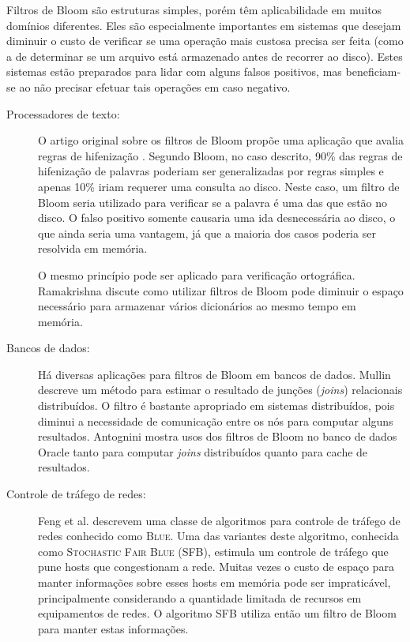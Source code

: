Filtros de Bloom são estruturas simples, porém têm aplicabilidade em muitos domínios diferentes. Eles são especialmente importantes em sistemas que desejam diminuir o custo de verificar se uma operação mais custosa precisa ser feita (como a de determinar se um arquivo está armazenado antes de recorrer ao disco). Estes sistemas estão preparados para lidar com alguns falsos positivos, mas beneficiam-se ao não precisar efetuar tais operações em caso negativo.

\begin{description}

\item[Processadores de texto:]

O artigo original sobre os filtros de Bloom propõe uma aplicação que avalia regras de hifenização \cite{bloom1970space}. Segundo Bloom, no caso descrito, 90\% das regras de hifenização de palavras poderiam ser generalizadas por regras simples e apenas 10\% iriam requerer uma consulta ao disco. Neste caso, um filtro de Bloom seria utilizado para verificar se a palavra é uma das que estão no disco. O falso positivo somente causaria uma ida desnecessária ao disco, o que ainda seria uma vantagem, já que a maioria dos casos poderia ser resolvida em memória.

O mesmo princípio pode ser aplicado para verificação ortográfica. Ramakrishna \cite{ramakrishna1989practical} discute como utilizar filtros de Bloom pode diminuir o espaço necessário para armazenar vários dicionários ao mesmo tempo em memória.

\item[Bancos de dados:]

Há diversas aplicações para filtros de Bloom em bancos de dados. Mullin \cite{mullin1993estimating} descreve um método para estimar o resultado de junções (\emph{joins}) relacionais distribuídos. O filtro é bastante apropriado em sistemas distribuídos, pois diminui a necessidade de comunicação entre os nós para computar alguns resultados. Antognini \cite{antognini2008bloom} mostra usos dos filtros de Bloom no banco de dados Oracle tanto para computar \emph{joins} distribuídos quanto para cache de resultados.

\item[Controle de tráfego de redes:]

Feng et al. \cite{feng1999blue} descrevem uma classe de algoritmos para controle de tráfego de redes conhecido como \textsc{Blue}. Uma das variantes deste algoritmo, conhecida como \textsc{Stochastic Fair Blue} (SFB), estimula um controle de tráfego que pune hosts que congestionam a rede. Muitas vezes o custo de espaço para manter informações sobre esses hosts em memória pode ser impraticável, principalmente considerando a quantidade limitada de recursos em equipamentos de redes. O algoritmo SFB utiliza então um filtro de Bloom para manter estas informações.


\end{description}
